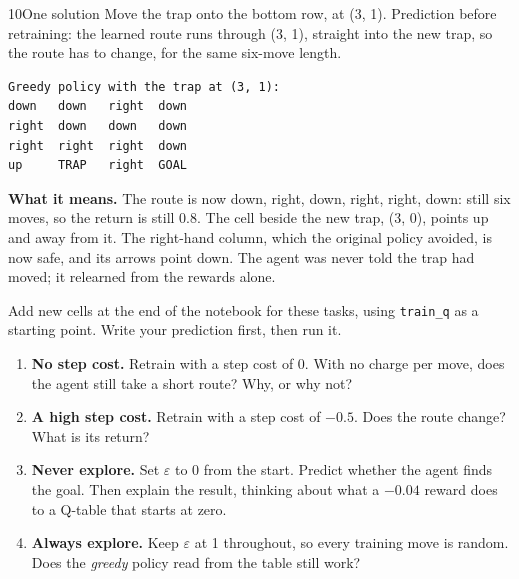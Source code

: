 \begin{labquestion}{10}{One solution}
Move the trap onto the bottom row, at (3, 1). Prediction before retraining: the learned route runs through (3, 1), straight into the new trap, so the route has to change, for the same six-move length.
\end{labquestion}
\begin{labanswer}

\begin{refoutput}
\begin{lstlisting}[style=utpterminal]
Greedy policy with the trap at (3, 1):
down   down   right  down
right  down   down   down
right  right  right  down
up     TRAP   right  GOAL
\end{lstlisting}
\end{refoutput}

\textbf{What it means.} The route is now down, right, down, right, right, down: still six moves, so the return is still 0.8. The cell beside the new trap, (3, 0), points up and away from it. The right-hand column, which the original policy avoided, is now safe, and its arrows point down. The agent was never told the trap had moved; it relearned from the rewards alone.
\end{labanswer}


\begin{yourturn}
Add new cells at the end of the notebook for these tasks, using \texttt{train\_q} as a starting point. Write your prediction first, then run it.
\begin{enumerate}
  \item \textbf{No step cost.} Retrain with a step cost of 0. With no charge per move, does the agent still take a short route? Why, or why not?
  \item \textbf{A high step cost.} Retrain with a step cost of $-0.5$. Does the route change? What is its return?
  \item \textbf{Never explore.} Set $\varepsilon$ to 0 from the start. Predict whether the agent finds the goal. Then explain the result, thinking about what a $-0.04$ reward does to a Q-table that starts at zero.
  \item \textbf{Always explore.} Keep $\varepsilon$ at 1 throughout, so every training move is random. Does the \emph{greedy} policy read from the table still work?
\end{enumerate}
\end{yourturn}

